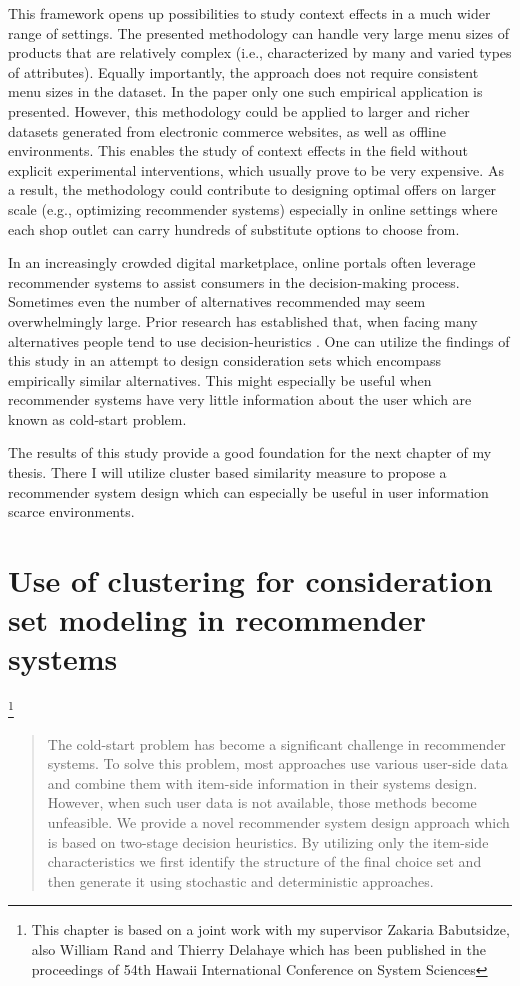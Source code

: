 \documentclass[a4paper,12pt]{article}
\begin{document}
This framework opens up possibilities to study context effects in a much wider range of settings. The presented methodology can handle very large menu sizes of products that are relatively complex (i.e., characterized by many and varied types of attributes). Equally importantly, the approach does not require consistent menu sizes in the dataset. In the paper only one such empirical application is presented. However, this methodology could be applied to larger and richer datasets generated from electronic commerce websites, as well as offline environments. This enables the study of context effects in the field without explicit experimental interventions, which usually prove to be very expensive. As a result, the methodology could contribute to designing optimal offers on larger scale (e.g., optimizing recommender systems) especially in online settings where each shop outlet can carry hundreds of substitute options to choose from. 

In an increasingly crowded digital marketplace, online portals often leverage recommender systems to assist consumers in the decision-making process. Sometimes even the number of alternatives recommended may seem overwhelmingly large. Prior research has established that, when facing many alternatives people tend to use decision-heuristics \citep{fishburn1974exceptional}. One can utilize the findings of this study in an attempt to design consideration sets which encompass empirically similar alternatives. This might especially be useful when recommender systems have very little information about the user which are known as cold-start problem. 

The results of this study provide a good foundation for the next chapter of my thesis. There I will utilize cluster based similarity measure to propose a recommender system design which can especially be useful in user information scarce environments.




\newpage
\section{Use of clustering for consideration set modeling in recommender systems}\footnote{This chapter is based on a joint work with my supervisor Zakaria Babutsidze, also William Rand and Thierry Delahaye which has been published in the proceedings of 54th Hawaii International Conference on System Sciences}

\begin{abstract}
        The cold-start problem has become a significant challenge in recommender systems. To solve this problem, most approaches use various user-side data  and combine them with item-side information in their systems design. However, when such user data is not available, those methods become unfeasible. We provide a novel recommender system design approach which is based on two-stage decision heuristics. By utilizing only the item-side characteristics we first identify the structure of the final choice set and then generate it using stochastic and deterministic approaches.
        
\end{abstract}
\end{document}
